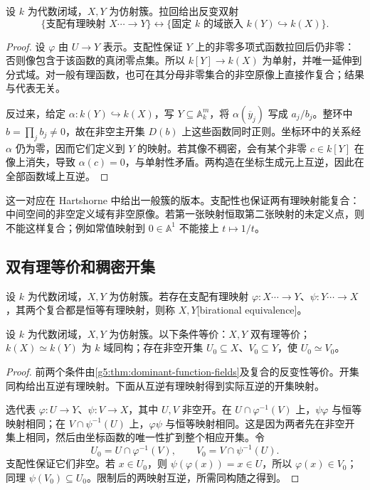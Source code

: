 \begin{theorem}\label{g5:thm:dominant-function-fields}
	设 \(k\) 为代数闭域，\(X,Y\) 为仿射簇。拉回给出反变双射
	\[
		\{\text{支配有理映射 }X\mathrel{\cdots\!\rightarrow} Y\}
		\longleftrightarrow
		\{\text{固定 }k\text{ 的域嵌入 }k(Y)\hookrightarrow k(X)\}.
	\]
\end{theorem}
\begin{proof}
	设 \(\varphi\) 由 \(U\rightarrow Y\) 表示。支配性保证 \(Y\) 上的非零多项式函数拉回后仍非零：否则像包含于该函数的真闭零点集。所以 \(k[Y]\rightarrow k(X)\) 为单射，并唯一延伸到分式域。对一般有理函数，也可在其分母非零集合的非空原像上直接作复合；结果与代表无关。

	反过来，给定 \(\alpha:k(Y)\hookrightarrow k(X)\)，写 \(Y\subseteq\mathbb A_k^m\)，将 \(\alpha(\overline y_j)\) 写成 \(a_j/b_j\)。整环中 \(b=\prod_j b_j\ne0\)，故在非空主开集 \(D(b)\) 上这些函数同时正则。坐标环中的关系经 \(\alpha\) 仍为零，因而它们定义到 \(Y\) 的映射。若其像不稠密，会有某个非零 \(c\in k[Y]\) 在像上消失，导致 \(\alpha(c)=0\)，与单射性矛盾。两构造在坐标生成元上互逆，因此在全部函数域上互逆。
\end{proof}

这一对应在 Hartshorne 中给出一般簇的版本\cite[第I章第4节，定理4.4]{Hartshorne1977}。支配性也保证两有理映射能复合：中间空间的非空定义域有非空原像。若第一张映射恒取第二张映射的未定义点，则不能这样复合；例如常值映射到 \(0\in\mathbb A^1\) 不能接上 \(t\mapsto1/t\)。

\subsection{双有理等价和稠密开集}
\label{g5:subsec:0102:03}

\begin{definition}\label{g5:def:birational}
	设 \(k\) 为代数闭域，\(X,Y\) 为仿射簇。若存在支配有理映射 \(\varphi:X\mathrel{\cdots\!\rightarrow} Y\)、\(\psi:Y\mathrel{\cdots\!\rightarrow} X\)，其两个复合都是恒等有理映射，则称 \(X,Y\)[birational equivalence]。
\end{definition}

\begin{theorem}\label{g5:thm:birational-open}
	设 \(k\) 为代数闭域，\(X,Y\) 为仿射簇。以下条件等价：\(X,Y\) 双有理等价；\(k(X)\simeq k(Y)\) 为 \(k\) 域同构；存在非空开集 \(U_0\subseteq X\)、\(V_0\subseteq Y\)，使 \(U_0\simeq V_0\)。
\end{theorem}
\begin{proof}
	前两个条件由\cref{g5:thm:dominant-function-fields}及复合的反变性等价。开集同构给出互逆有理映射。下面从互逆有理映射得到实际互逆的开集映射。

	选代表 \(\varphi:U\rightarrow Y\)、\(\psi:V\rightarrow X\)，其中 \(U,V\) 非空开。在 \(U\cap\varphi^{-1}(V)\) 上，\(\psi\varphi\) 与恒等映射相同；在 \(V\cap\psi^{-1}(U)\) 上，\(\varphi\psi\) 与恒等映射相同。这是因为两者先在非空开集上相同，然后由坐标函数的唯一性扩到整个相应开集。令
	\[
		U_0=U\cap\varphi^{-1}(V),\qquad
		V_0=V\cap\psi^{-1}(U).
	\]
	支配性保证它们非空。若 \(x\in U_0\)，则 \(\psi(\varphi(x))=x\in U\)，所以 \(\varphi(x)\in V_0\)；同理 \(\psi(V_0)\subseteq U_0\)。限制后的两映射互逆，所需同构随之得到。
\end{proof}

